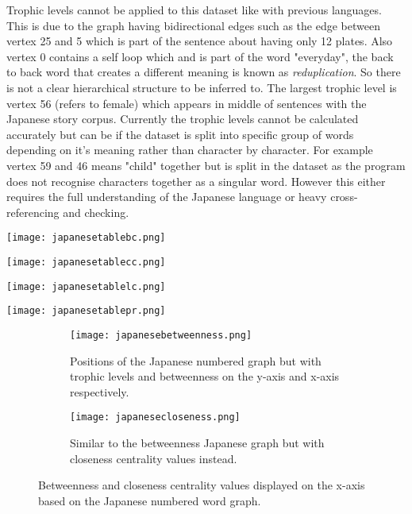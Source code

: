Trophic levels cannot be applied to this dataset like with previous languages. This is due to the graph having bidirectional edges such as the edge between vertex 25 and 5 which is part of the sentence about having only 12 plates. Also vertex 0 contains a self loop which and is part of the word "everyday", the back to back word that creates a different meaning is known as \emph{reduplication}. So there is not a clear hierarchical structure to be inferred to. The largest trophic level is vertex 56 (refers to female) which appears in middle of sentences with the Japanese story corpus. Currently the trophic levels cannot be calculated accurately but can be if the dataset is split into specific group of words depending on it's meaning rather than character by character. For example vertex 59 and 46 means "child" together but is split in the dataset as the program does not recognise characters together as a singular word. However this either requires the full understanding of the Japanese language or heavy cross-referencing and checking. 

\begin{table}[H]
\centering
\begin{subtable}{.2\textwidth}
	\centering
	\texttt{[image: japanesetablebc.png]}
	\caption{}
	\label{table:japanesetablebc}
\end{subtable}
\hfill
\begin{subtable}{.2\textwidth}
	\centering
	\texttt{[image: japanesetablecc.png]}
	\caption{}
	\label{table:japanesetablecc}
\end{subtable}
\hfill
\begin{subtable}{.2\textwidth}
	\centering
	\texttt{[image: japanesetablelc.png]}
	\caption{}
	\label{table:japanesetablelc}
\end{subtable}
\hfill
\begin{subtable}{.2\textwidth}
	\centering
	\texttt{[image: japanesetablepr.png]}
	\caption{}
	\label{table:japanesetablepr}
\end{subtable}
\caption{}
\end{table}

\begin{figure}[H]
\centering
\begin{subfigure}{.45\textwidth}
	\hspace{-1cm} 
	\texttt{[image: japanesebetweenness.png]}
	\caption{Positions of the Japanese numbered graph but with trophic levels and betweenness on the y-axis and x-axis respectively.}
	\label{fig:jpbc}
\end{subfigure}
\hfill
\begin{subfigure}{.45\textwidth}
	\hspace{-1cm} 
	\texttt{[image: japanesecloseness.png]}
	\caption{Similar to the betweenness Japanese graph but with closeness centrality values instead. }
	\label{fig:jpcc}
\end{subfigure}
\caption{Betweenness and closeness centrality values displayed on the x-axis based on the Japanese numbered word graph.}
\label{fig:jpcentrality}
\end{figure}

